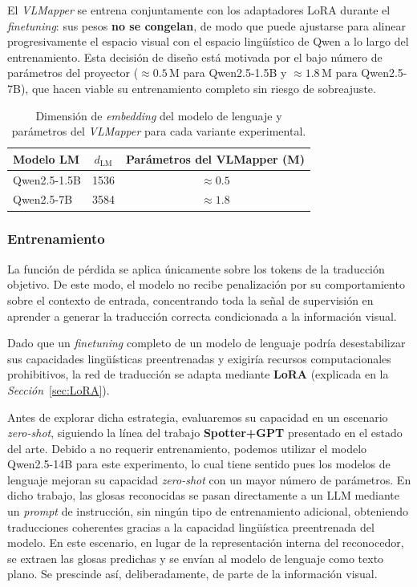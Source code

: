 El \textit{VLMapper} se entrena conjuntamente con los adaptadores LoRA durante el \textit{finetuning}: sus pesos \textbf{no se congelan}, de modo que puede ajustarse para alinear progresivamente el espacio visual con el espacio lingüístico de Qwen a lo largo del entrenamiento.
Esta decisión de diseño está motivada por el bajo número de parámetros del proyector ($\approx 0.5$\,M para Qwen2.5-1.5B y $\approx 1.8$\,M para Qwen2.5-7B), que hacen viable su entrenamiento completo sin riesgo de sobreajuste.
\begin{table}[H]
    \centering
    \begin{tabular}{lcc}
        \hline
        \textbf{Modelo LM} & \textbf{$d_{\text{LM}}$} & \textbf{Parámetros del VLMapper (M)} \\ \hline
        Qwen2.5-1.5B & 1536 & $\approx 0.5$ \\
        Qwen2.5-7B   & 3584 & $\approx 1.8$ \\ \hline
    \end{tabular}
    \caption{Dimensión de \textit{embedding} del modelo de lenguaje y parámetros del \textit{VLMapper} para cada variante experimental.}
    \label{tab:vlmapper}
\end{table}

\subsubsection*{Entrenamiento}
La función de pérdida se aplica únicamente sobre los tokens de la traducción objetivo.
De este modo, el modelo no recibe penalización por su comportamiento sobre el contexto de entrada, concentrando toda la señal de supervisión en aprender a generar la traducción correcta condicionada a la información visual.

Dado que un \textit{finetuning} completo de un modelo de lenguaje podría desestabilizar sus capacidades lingüísticas preentrenadas y exigiría recursos computacionales prohibitivos, la red de traducción se adapta mediante \textbf{LoRA} (explicada en la \textit{Sección}~\ref{sec:LoRA}).

Antes de explorar dicha estrategia, evaluaremos su capacidad en un escenario \textit{zero-shot}, siguiendo la línea del trabajo \textbf{Spotter+GPT} \cite{SpotterGPT} presentado en el estado del arte.
Debido a no requerir entrenamiento, podemos utilizar el modelo Qwen2.5-14B para este experimento, lo cual tiene sentido pues los modelos de lenguaje mejoran su capacidad \textit{zero-shot} con un mayor número de parámetros.
En dicho trabajo, las glosas reconocidas se pasan directamente a un LLM mediante un \textit{prompt} de instrucción, sin ningún tipo de entrenamiento adicional, obteniendo traducciones coherentes gracias a la capacidad lingüística preentrenada del modelo.
En este escenario, en lugar de la representación interna del reconocedor, se extraen las glosas predichas y se envían al modelo de lenguaje como texto plano.
Se prescinde así, deliberadamente, de parte de la información visual.

